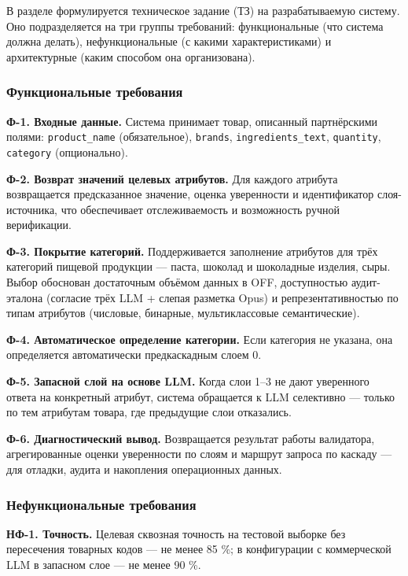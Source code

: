 В разделе формулируется техническое задание (ТЗ) на разрабатываемую систему. Оно подразделяется на три группы требований: функциональные (что система должна делать), нефункциональные (с какими характеристиками) и архитектурные (каким способом она организована).

\subsubsection{Функциональные требования}

\textbf{Ф-1. Входные данные.} Система принимает товар, описанный партнёрскими полями: \texttt{product\_name} (обязательное), \texttt{brands}, \texttt{ingredients\_text}, \texttt{quantity}, \texttt{category} (опционально).

\textbf{Ф-2. Возврат значений целевых атрибутов.} Для каждого атрибута возвращается предсказанное значение, оценка уверенности и идентификатор слоя-источника, что обеспечивает отслеживаемость и возможность ручной верификации.

\textbf{Ф-3. Покрытие категорий.} Поддерживается заполнение атрибутов для трёх категорий пищевой продукции — паста, шоколад и шоколадные изделия, сыры. Выбор обоснован достаточным объёмом данных в OFF, доступностью аудит-эталона (согласие трёх LLM + слепая разметка Opus) и репрезентативностью по типам атрибутов (числовые, бинарные, мультиклассовые семантические).

\textbf{Ф-4. Автоматическое определение категории.} Если категория не указана, она определяется автоматически предкаскадным слоем 0.

\textbf{Ф-5. Запасной слой на основе LLM.} Когда слои 1–3 не дают уверенного ответа на конкретный атрибут, система обращается к LLM селективно — только по тем атрибутам товара, где предыдущие слои отказались.

\textbf{Ф-6. Диагностический вывод.} Возвращается результат работы валидатора, агрегированные оценки уверенности по слоям и маршрут запроса по каскаду — для отладки, аудита и накопления операционных данных.

\subsubsection{Нефункциональные требования}

\textbf{НФ-1. Точность.} Целевая сквозная точность на тестовой выборке без пересечения товарных кодов — не менее 85 \%; в конфигурации с коммерческой LLM в запасном слое — не менее 90 \%.

